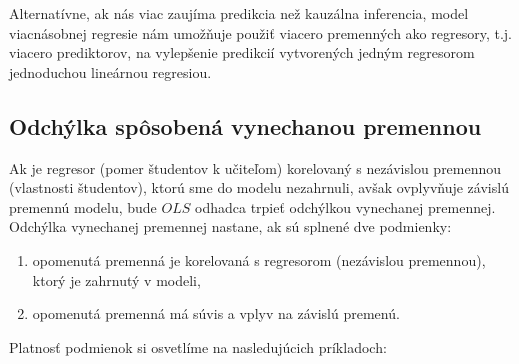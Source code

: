 \documentclass[]{tukediphc}
\begin{document}
Alternatívne, ak nás viac zaujíma predikcia než kauzálna inferencia, model viacnásobnej regresie nám umožňuje použiť viacero premenných ako regresory, t.j. viacero prediktorov, na vylepšenie predikcií vytvorených jedným regresorom jednoduchou lineárnou regresiou.

\subsection{Odchýlka spôsobená vynechanou premennou}

Ak je regresor (pomer študentov k učiteľom) korelovaný s nezávislou premennou (vlastnosti študentov), ktorú sme do modelu nezahrnuli, avšak ovplyvňuje závislú premennú modelu, bude $OLS$ odhadca trpieť odchýlkou vynechanej premennej. 
Odchýlka vynechanej premennej nastane, ak sú splnené dve podmienky:
\begin{enumerate}
\item opomenutá premenná je korelovaná s regresorom (nezávislou premennou), ktorý je zahrnutý v modeli,
\item opomenutá premenná má súvis a vplyv na závislú premenú.
\end{enumerate}
Platnosť podmienok si osvetlíme na nasledujúcich príkladoch:
\end{document}

